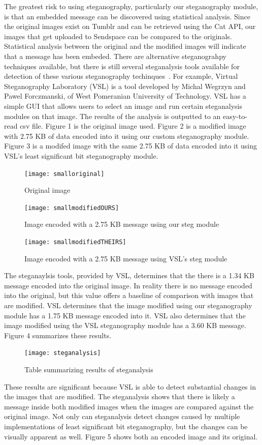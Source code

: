 The greatest risk to using steganography, particularly our steganography module, is that an embedded message can be discovered using statistical analysis. Since the original images exist on Tumblr and can be retrieved using the Cat API, our images that get uploaded to Sendspace can be compared to the originals. Statistical analysis between the original and the modified images will indicate that a message has been embeded. There are alternative steganograhpy techniques available, but there is still several steganalysis tools available for detection of these various steganography techinques~\cite{Laden}. For example, Virtual Steganography Laboratory (VSL) is a tool developed by Michal Wegrzyn and Pawel Forczmanski, of West Pomeranian University of Technology. VSL has a simple GUI that allows users to select an image and run certain steganalysis modules on that image. The results of the analysis is outputted to an easy-to-read csv file. Figure 1 is the original image used. Figure 2 is a modified image with 2.75 KB of data encoded into it using our custom steganography module. Figure 3 is a modifed image with the same 2.75 KB of data encoded into it using VSL's least significant bit steganography module.
\begin{figure}[h]
	\texttt{[image: smalloriginal]}
	\caption{Original image}
\end{figure}
\begin{figure}[h]
	\texttt{[image: smallmodifiedOURS]}
	\caption{Image encoded with a 2.75 KB message using our steg module}
\end{figure}
\begin{figure}[h]
	\texttt{[image: smallmodifiedTHEIRS]}
	\caption{Image encoded with a 2.75 KB message using VSL's steg module}
\end{figure}
The steganaylsis tools, provided by VSL, determines that the there is a 1.34 KB message encoded into the original image. In reality there is no message encoded into the original, but this value offers a baseline of comparison with images that are modified. VSL determines that the image modified using our steganography module has a 1.75 KB message encoded into it. VSL also determines that the image modified using the VSL steganography module has a 3.60 KB message. Figure 4 summarizes these results.
\begin{figure}[h]
	\texttt{[image: steganalysis]}
	\caption{Table summarizing results of steganalysis}
\end{figure}
These results are significant because VSL is able to detect substantial changes in the images that are modified. The steganalysis shows that there is likely a message inside both modified images when the images are compared against the original image. Not only can steganalysis detect changes caused by multiple implementations of least significant bit steganography, but the changes can be visually apparent as well. Figure 5 shows both an encoded image and its original.
